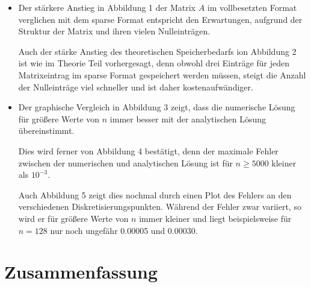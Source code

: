 \documentclass{scrartcl}
\theoremstyle{remark}
\begin{document}

\begin{itemize}
  \item Der stärkere Anstieg in Abbildung 1 der Matrix \(A\) im vollbesetzten Format verglichen mit dem sparse Format
        entspricht den Erwartungen, aufgrund der Struktur der Matrix und ihren vielen Nulleinträgen.

        Auch der stärke Anstieg des theoretischen Speicherbedarfs ion Abbildung 2 ist wie im Theorie Teil vorhergesagt, denn obwohl drei
        Einträge für jeden Matrixeintrag im sparse Format gespeichert werden müssen, steigt die Anzahl der Nulleinträge viel 
        schneller und ist daher kostenaufwändiger.

  \item Der graphische Vergleich in Abbildung 3 zeigt, dass die numerische Lösung für größere Werte von \(n\) immer besser
        mit der analytischen Lösung übereinstimmt.

        Dies wird ferner von Abbildung 4 bestätigt, denn der maximale Fehler zwischen der numerischen und analytischen Lösung
        ist für \(n \geqslant 5000\) kleiner als \(10^{-3}\).

        Auch Abbildung 5 zeigt dies nochmal durch einen Plot des Fehlers an den verschiedenen Diskretisierungspunkten.
        Während der Fehler zwar variiert, so wird er für größere Werte von \(n\) immer kleiner und liegt beispielsweise
        für \(n = 128\) nur noch ungefähr 0.00005 und 0.00030. 
\end{itemize}


\section{Zusammenfassung}



\printbibliography
\end{document}

